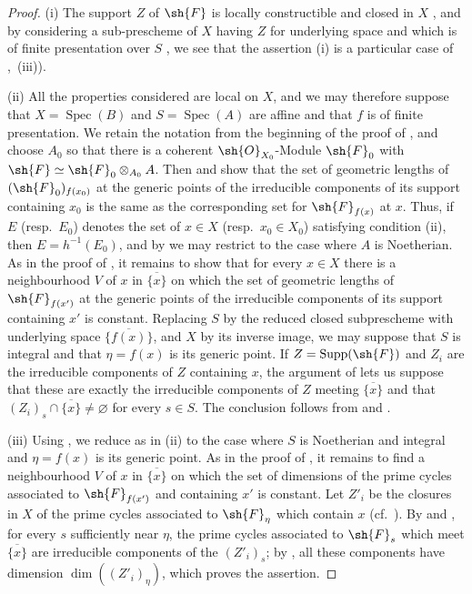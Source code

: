 \begin{proof}
\label{IV.9.9.2-proof}
(i) The support $Z$ of $\sh{F}$ is locally constructible and closed in $X$ , and by considering a sub-prescheme of $X$ having $Z$ for underlying space and which is of finite presentation over $S$ , we see that the assertion (i) is a particular case of ,~(iii)).

(ii) All the properties considered are local on $X$, and we may therefore suppose that $X=\operatorname{Spec}(B)$ and $S=\operatorname{Spec}(A)$ are affine and that $f$ is of finite presentation.
We retain the notation from the beginning of the proof of , and choose $A_0$ so that there is a coherent $\sh{O}_{X_0}$-Module $\sh{F}_0$ with $\sh{F}\simeq\sh{F}_0\otimes_{A_0}A$.
Then  and  show that the set of geometric lengths of $(\sh{F}_0)_{f(x_0)}$ at the generic points of the irreducible components of its support containing $x_0$ is the same as the corresponding set for $\sh{F}_{f(x)}$ at $x$.
Thus, if $E$ (resp.~$E_0$) denotes the set of $x\in X$ (resp.~$x_0\in X_0$) satisfying condition (ii), then $E=h^{-1}(E_0)$, and by  we may restrict to the case where $A$ is Noetherian.
As in the proof of , it remains to show that for every $x\in X$ there is a neighbourhood $V$ of $x$ in $\overline{\{x\}}$ on which the set of geometric lengths of $\sh{F}_{f(x')}$ at the generic points of the irreducible components of its support containing $x'$ is constant.
Replacing $S$ by the reduced closed subprescheme with underlying space $\overline{\{f(x)\}}$, and $X$ by its inverse image, we may suppose that $S$ is integral and that $\eta=f(x)$ is its generic point.
If $Z=\operatorname{Supp}(\sh{F})$ and $Z_i$ are the irreducible components of $Z$ containing $x$, the argument of  lets us suppose that these are exactly the irreducible components of $Z$ meeting $\overline{\{x\}}$ and that $(Z_i)_s\cap\overline{\{x\}}\neq\varnothing$ for every $s\in S$.
The conclusion follows from  and .

(iii) Using , we reduce as in (ii) to the case where $S$ is Noetherian and integral and $\eta=f(x)$ is its generic point.
As in the proof of , it remains to find a neighbourhood $V$ of $x$ in $\overline{\{x\}}$ on which the set of dimensions of the prime cycles associated to $\sh{F}_{f(x')}$ and containing $x'$ is constant.
Let $Z'_i$ be the closures in $X$ of the prime cycles associated to $\sh{F}_\eta$ which contain $x$ (cf.~).
By  and , for every $s$ sufficiently near $\eta$, the prime cycles associated to $\sh{F}_s$ which meet $\overline{\{x\}}$ are irreducible components of the $(Z'_i)_s$; by , all these components have dimension $\dim((Z'_i)_\eta)$, which proves the assertion.


\end{proof}
